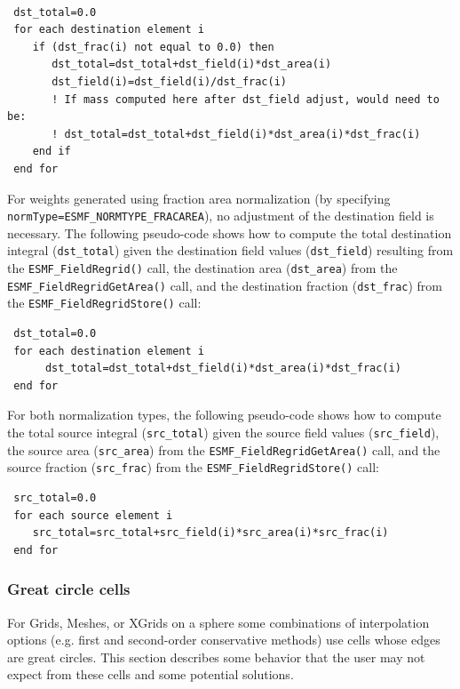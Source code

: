 \begin{verbatim}

 dst_total=0.0
 for each destination element i
    if (dst_frac(i) not equal to 0.0) then
       dst_total=dst_total+dst_field(i)*dst_area(i) 
       dst_field(i)=dst_field(i)/dst_frac(i)
       ! If mass computed here after dst_field adjust, would need to be:
       ! dst_total=dst_total+dst_field(i)*dst_area(i)*dst_frac(i) 
    end if
 end for
\end{verbatim}

For weights generated using fraction area normalization (by specifying {\tt normType=ESMF\_NORMTYPE\_FRACAREA}),
no adjustment of the destination field is necessary. The following pseudo-code shows how to compute 
the total destination integral ({\tt dst\_total}) given the
destination field values ({\tt dst\_field}) resulting
from the {\tt ESMF\_FieldRegrid()} call, the destination area ({\tt dst\_area}) from the {\tt ESMF\_FieldRegridGetArea()}
call,  and the destination fraction ({\tt dst\_frac}) from the {\tt ESMF\_FieldRegridStore()} call:

\begin{verbatim}
 dst_total=0.0
 for each destination element i
      dst_total=dst_total+dst_field(i)*dst_area(i)*dst_frac(i) 
 end for
\end{verbatim}

 For both normalization types, the following pseudo-code shows how to compute the total source integral ({\tt src\_total}) given the source field values
 ({\tt src\_field}), the source area ({\tt src\_area}) from the {\tt ESMF\_FieldRegridGetArea()} call, and
 the source fraction ({\tt src\_frac}) from the {\tt ESMF\_FieldRegridStore()} call:

\begin{verbatim}
 src_total=0.0
 for each source element i
    src_total=src_total+src_field(i)*src_area(i)*src_frac(i)
 end for
\end{verbatim}

\subsubsection{Great circle cells}\label{sec:interpolation:great_circle_cells}
 For Grids, Meshes, or XGrids on a sphere some combinations of interpolation options 
 (e.g. first and second-order conservative methods) use cells whose edges are great circles. This section describes some behavior 
 that the user may not expect from these cells and some potential solutions. 
 
